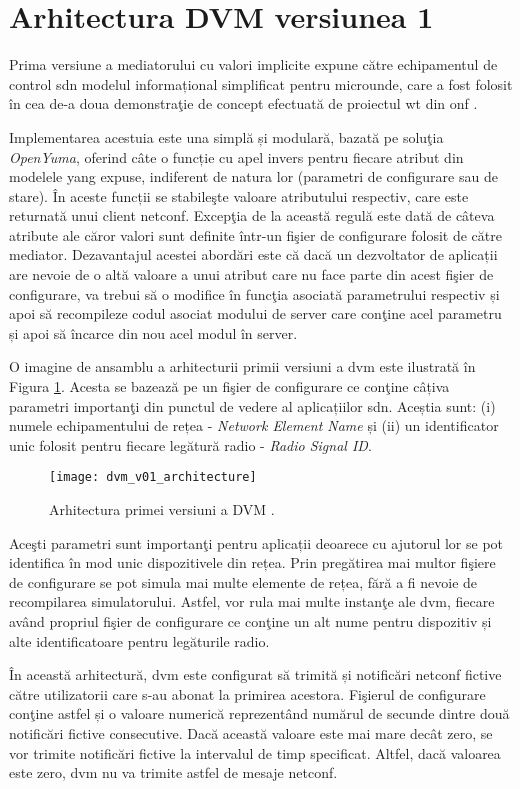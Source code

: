 \section{Arhitectura DVM versiunea 1}

Prima versiune a mediatorului cu valori implicite expune către echipamentul de control \gls{sdn} modelul informațional simplificat pentru microunde, care a fost folosit în cea de-a doua demonstraţie de concept efectuată de proiectul \gls{wt} din \gls{onf} \cite{stancu2016default}.

Implementarea acestuia este una simplă și modulară, bazată pe soluţia \textit{OpenYuma}, oferind câte o funcție cu apel invers pentru fiecare atribut din modelele \gls{yang} expuse, indiferent de natura lor (parametri de configurare sau de stare). În aceste funcții se stabileşte valoare atributului respectiv, care este returnată unui client \gls{netconf}. Excepţia de la această regulă este dată de câteva atribute ale căror valori sunt definite într-un fişier de configurare folosit de către mediator. Dezavantajul acestei abordări este că dacă un dezvoltator de aplicații are nevoie de o altă valoare a unui atribut care nu face parte din acest fişier de configurare, va trebui să o modifice în funcţia asociată parametrului respectiv și apoi să recompileze codul asociat modului de server care conţine acel parametru și apoi să încarce din nou acel modul în server.

O imagine de ansamblu a arhitecturii primii versiuni a \gls{dvm} este ilustrată în Figura \ref{fig:dvm_v01_architecture}. Acesta se bazează pe un fişier de configurare ce conţine câțiva parametri importanţi din punctul de vedere al aplicațiilor \gls{sdn}. Aceștia sunt: (i) numele echipamentului de rețea - \textit{Network Element Name} și (ii) un identificator unic folosit pentru fiecare legătură radio - \textit{Radio Signal ID}.

\begin{figure}[h]
	\centering
	\texttt{[image: dvm\_v01\_architecture]}
	\caption{Arhitectura primei versiuni a DVM \cite{stancu2016default}.}
	\label{fig:dvm_v01_architecture}
\end{figure}

Aceşti parametri sunt importanţi pentru aplicații deoarece cu ajutorul lor se pot identifica în mod unic dispozitivele din rețea. Prin pregătirea mai multor fişiere de configurare se pot simula mai multe elemente de rețea, fără a fi nevoie de recompilarea simulatorului. Astfel, vor rula mai multe instanţe ale \gls{dvm}, fiecare având propriul fişier de configurare ce conţine un alt nume pentru dispozitiv și alte identificatoare pentru legăturile radio.

În această arhitectură, \gls{dvm} este configurat să trimită și notificări \gls{netconf} fictive către utilizatorii care s-au abonat la primirea acestora. Fişierul de configurare conţine astfel și o valoare numerică reprezentând numărul de secunde dintre două notificări fictive consecutive. Dacă această valoare este mai mare decât zero, se vor trimite notificări fictive la intervalul de timp specificat. Altfel, dacă valoarea este zero, \gls{dvm} nu va trimite astfel de mesaje \gls{netconf}.